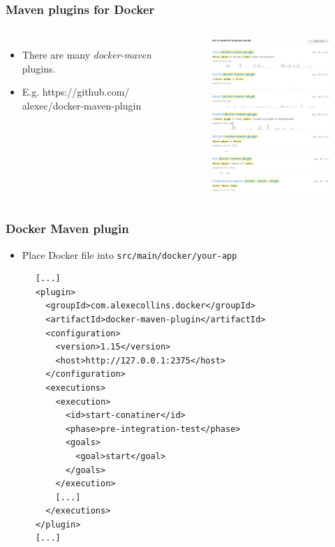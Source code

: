 \documentclass[10pt,utf8]{beamer}
\begin{document}
\begin{frame}
	\frametitle{Maven plugins for Docker}
	\begin{columns}
		\begin{itemize}
			\item There are many \textit{docker-maven} plugins.
			\item E.g. https://github.com/ alexec/docker-maven-plugin
		\end{itemize}
		
		\begin{figure}
			\centering
			\hspace{-1cm}
			\includegraphics[width=7cm]{./img/docker-maven-plugin.eps}
		\end{figure}
	\end{columns}
\end{frame}

\begin{frame}[fragile]
  \frametitle{Docker Maven plugin}
	\begin{itemize}
		\item Place Docker file into \texttt{src/main/docker/your-app}
	\end{itemize}

	\scriptsize{
		\lstset{language=XML}
		\begin{lstlisting}
      [...]
      <plugin>
        <groupId>com.alexecollins.docker</groupId>
        <artifactId>docker-maven-plugin</artifactId>
        <configuration>
          <version>1.15</version>
          <host>http://127.0.0.1:2375</host>
        </configuration>
        <executions>
          <execution>
            <id>start-conatiner</id>
            <phase>pre-integration-test</phase>
            <goals>
              <goal>start</goal>
            </goals>
          </execution>
          [...]
        </executions>
      </plugin>
      [...]
		\end{lstlisting}
	}
\end{frame}
\end{document}
